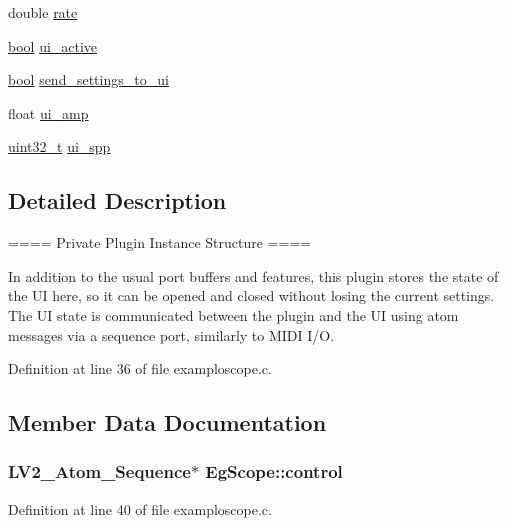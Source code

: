 \begin{DoxyCompactItemize}
\item 
double \hyperlink{struct_eg_scope_af2dae6142593e344dbc655acb1e48211}{rate}
\item 
\hyperlink{mac_2config_2i386_2lib-src_2libsoxr_2soxr-config_8h_abb452686968e48b67397da5f97445f5b}{bool} \hyperlink{struct_eg_scope_ae94d417ae78e4820338f02b6e52afaaa}{ui\+\_\+active}
\item 
\hyperlink{mac_2config_2i386_2lib-src_2libsoxr_2soxr-config_8h_abb452686968e48b67397da5f97445f5b}{bool} \hyperlink{struct_eg_scope_a3fd4064d2f0f08a756857ce489b5f569}{send\+\_\+settings\+\_\+to\+\_\+ui}
\item 
float \hyperlink{struct_eg_scope_ae66d56d7df7c90a14fb03b20fc025df7}{ui\+\_\+amp}
\item 
\hyperlink{lib-src_2ffmpeg_2win32_2stdint_8h_a6eb1e68cc391dd753bc8ce896dbb8315}{uint32\+\_\+t} \hyperlink{struct_eg_scope_aeab1da6e96278a3e1210a8488260dcad}{ui\+\_\+spp}
\end{DoxyCompactItemize}


\subsection{Detailed Description}
==== Private Plugin Instance Structure ====

In addition to the usual port buffers and features, this plugin stores the state of the UI here, so it can be opened and closed without losing the current settings. The UI state is communicated between the plugin and the UI using atom messages via a sequence port, similarly to M\+I\+DI I/O. 

Definition at line 36 of file examploscope.\+c.



\subsection{Member Data Documentation}
\subsubsection[{\texorpdfstring{control}{control}}]{ {\bf L\+V2\+\_\+\+Atom\+\_\+\+Sequence}$\ast$ Eg\+Scope\+::control}\hypertarget{struct_eg_scope_a880393b81c269e0d86daaa946a3907e2}{}\label{struct_eg_scope_a880393b81c269e0d86daaa946a3907e2}


Definition at line 40 of file examploscope.\+c.

